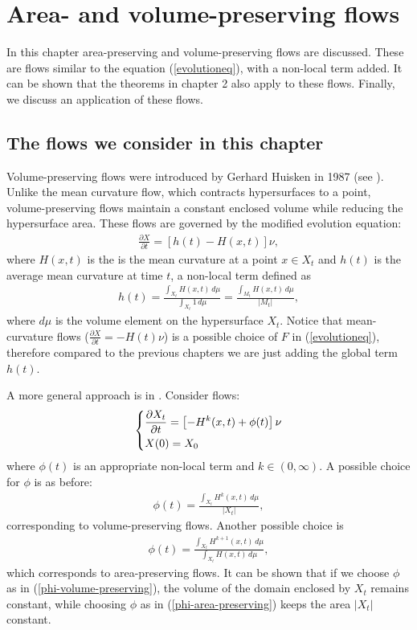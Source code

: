 \chapter{Area- and volume-preserving flows}
In this chapter area-preserving and volume-preserving flows are discussed. These are flows similar to the equation (\ref{evolutioneq}), with a non-local term added. It can be shown that the theorems in chapter 2 also apply to these flows. Finally, we discuss an application of these flows. 
\section{The flows we consider in this chapter}
Volume-preserving flows were introduced by Gerhard Huisken in 1987 (see \cite{volpres}).  Unlike the mean curvature flow, which contracts hypersurfaces to a point, volume-preserving flows maintain a constant enclosed volume while reducing the hypersurface area. These flows are governed by the modified evolution equation:
\begin{align*}
	\frac{\partial X}{\partial t} = \left[h(t) - H(x, t)\right]\nu,
\end{align*}
where $ H(x, t)$ is the is the mean curvature at a point $x\in X_t$ and $h(t)$ is the average mean curvature at time $t$, a non-local term defined as 
\begin{align*}
	h(t) = \frac{\int_{X_t} H(x, t) \, d\mu}{\int_{X_t} 1 \, d\mu}= \frac{\int_{M_t} H(x, t) \, d\mu}{|M_t|},
\end{align*}
where $d\mu$ is the volume element on the hypersurface \( X_t \).
Notice that mean-curvature flows ($\frac{\partial X}{\partial t} = - H(t)\nu$) is a possible choice of $F$ in (\ref{evolutioneq}), therefore compared to the previous chapters we are just adding the global term $h(t)$. 

A more general approach is in \cite{calcvar15}. Consider flows: 
\begin{align}
	\begin{dcases}
		\frac{\partial X_t}{\partial t} = \left[- H^k(x, t) + \phi(t)\right] \nu\\
		X(0)= X_0
	\end{dcases} \label{chapter 4 equation}
\end{align}
where $\phi(t)$ is an appropriate non-local term and $k\in (0, \infty)$. A possible choice for $\phi$ is as before: 
\begin{align}
	\phi(t) = \frac{\int_{X_t} H^k(x, t) \, d\mu}{|X_t|}, \label{phi-volume-preserving}
\end{align}
corresponding to volume-preserving flows. Another possible choice is
\begin{align}
	\phi(t) = \frac{\int_{X_t} H^{k+1}(x, t) \, d\mu}{\int_{X_t} H(x, t) \, d\mu}, \label{phi-area-preserving}
\end{align}
which corresponds to area-preserving flows. It can be shown that if we choose $\phi$ as in (\ref{phi-volume-preserving}), the volume of the domain enclosed by $X_t$ remains constant, while choosing $\phi$ as in (\ref{phi-area-preserving}) keeps the area $|X_t|$ constant. 

